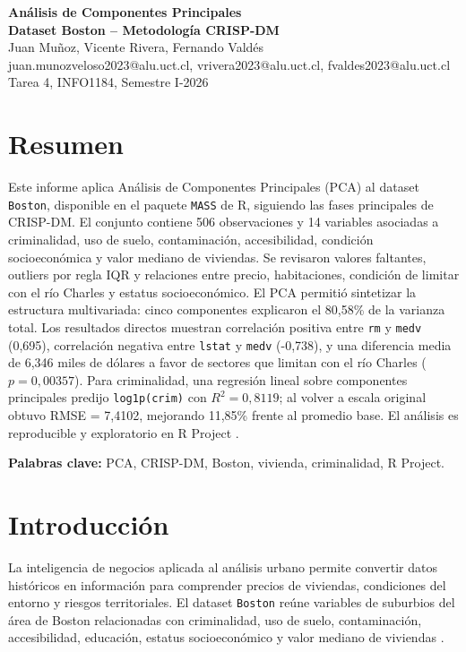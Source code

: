 \documentclass[10pt,a4paper]{article}
\begin{document}
\begin{center}
  {\LARGE \textbf{Análisis de Componentes Principales}} \\[4pt]
  {\LARGE \textbf{Dataset Boston -- Metodología CRISP-DM}} \\[10pt]
  {\normalsize Juan Muñoz, Vicente Rivera, Fernando Valdés} \\[2pt]
  {\small juan.munozveloso2023@alu.uct.cl, vrivera2023@alu.uct.cl, fvaldes2023@alu.uct.cl} \\[2pt]
  {\small Tarea 4, INFO1184, Semestre I-2026}
\end{center}

\section*{Resumen}

Este informe aplica Análisis de Componentes Principales (PCA) al dataset \texttt{Boston}, disponible en el paquete \texttt{MASS} de R, siguiendo las fases principales de CRISP-DM. El conjunto contiene 506 observaciones y 14 variables asociadas a criminalidad, uso de suelo, contaminación, accesibilidad, condición socioeconómica y valor mediano de viviendas. Se revisaron valores faltantes, outliers por regla IQR y relaciones entre precio, habitaciones, condición de limitar con el río Charles y estatus socioeconómico. El PCA permitió sintetizar la estructura multivariada: cinco componentes explicaron el 80,58\% de la varianza total. Los resultados directos muestran correlación positiva entre \texttt{rm} y \texttt{medv} (0,695), correlación negativa entre \texttt{lstat} y \texttt{medv} (-0,738), y una diferencia media de 6,346 miles de dólares a favor de sectores que limitan con el río Charles ($p = 0,00357$). Para criminalidad, una regresión lineal sobre componentes principales predijo \texttt{log1p(crim)} con $R^{2} = 0,8119$; al volver a escala original obtuvo RMSE = 7,4102, mejorando 11,85\% frente al promedio base. El análisis es reproducible y exploratorio en R Project \citep{rcore2024}.

\textbf{Palabras clave:} PCA, CRISP-DM, Boston, vivienda, criminalidad, R Project.

\section{Introducción}

La inteligencia de negocios aplicada al análisis urbano permite convertir datos históricos en información para comprender precios de viviendas, condiciones del entorno y riesgos territoriales. El dataset \texttt{Boston} reúne variables de suburbios del área de Boston relacionadas con criminalidad, uso de suelo, contaminación, accesibilidad, educación, estatus socioeconómico y valor mediano de viviendas \citep{harrison1978, venables2002}.
\end{document}
